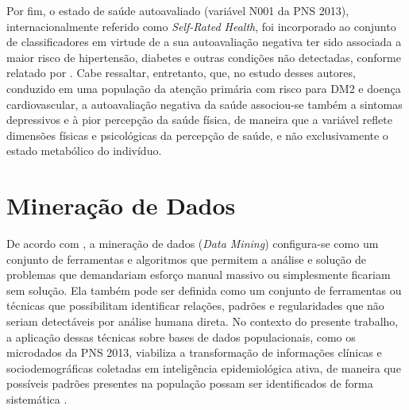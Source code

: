 Por fim, o estado de saúde autoavaliado (variável N001 da PNS 2013), internacionalmente referido como \textit{Self-Rated Health}, foi incorporado ao conjunto de classificadores em virtude de a sua autoavaliação negativa ter sido associada a maior risco de hipertensão, diabetes e outras condições não detectadas, conforme relatado por \textcite{Rantanen2019}. Cabe ressaltar, entretanto, que, no estudo desses autores, conduzido em uma população da atenção primária com risco para DM2 e doença cardiovascular, a autoavaliação negativa da saúde associou-se também a sintomas depressivos e à pior percepção da saúde física, de maneira que a variável reflete dimensões físicas e psicológicas da percepção de saúde, e não exclusivamente o estado metabólico do indivíduo.

\section{Mineração de Dados} \label{sec:mineracao}

De acordo com \textcite{mining2006introduction}, a mineração de dados (\textit{Data Mining}) configura-se como um conjunto de ferramentas e algoritmos que permitem a análise e solução de problemas que demandariam esforço manual massivo ou simplesmente ficariam sem solução. Ela também pode ser definida como um conjunto de ferramentas ou técnicas que possibilitam identificar relações, padrões e regularidades que não seriam detectáveis por análise humana direta. No contexto do presente trabalho, a aplicação dessas técnicas sobre bases de dados populacionais, como os microdados da PNS 2013, viabiliza a transformação de informações clínicas e sociodemográficas coletadas em inteligência epidemiológica ativa, de maneira que possíveis padrões presentes na população possam ser identificados de forma sistemática \cite{islam2024comprehensive}.

